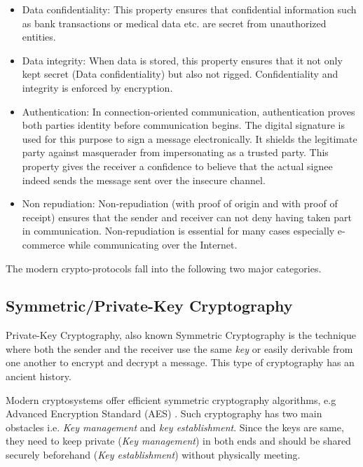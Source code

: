 \begin{itemize}
\item Data confidentiality: 
This property ensures that confidential information such as bank transactions or medical data etc. are secret from unauthorized entities. 

\item Data integrity:  
When data is stored, this property ensures that it not only kept secret (Data confidentiality) but also not rigged.
Confidentiality and integrity is enforced by encryption.

\item Authentication: 
In connection-oriented communication, authentication proves both parties identity before communication begins.
The digital signature is used for this purpose to sign a message electronically.
It shields the legitimate party against masquerader from impersonating as a trusted party.
This property gives the receiver a confidence to believe that the actual signee indeed sends the message sent over the insecure channel.

\item Non repudiation:
Non-repudiation (with proof of origin and with proof of receipt) ensures that the sender and receiver can not deny having taken part in communication.
Non-repudiation is essential for many cases especially e-commerce while communicating over the Internet.
\end{itemize}

The modern crypto-protocols fall into the following two major categories. 

\subsection{Symmetric/Private-Key Cryptography} 
Private-Key Cryptography, also known Symmetric Cryptography is the technique where both the sender and the receiver use the same \textit{key} or easily derivable from one another to encrypt and decrypt a message.
This type of cryptography has an ancient history. 

Modern cryptosystems offer efficient symmetric cryptography algorithms, e.g Advanced Encryption Standard (AES) \cite{AES_DaemenR02}.
Such cryptography has two main obstacles i.e. \textit{Key management} and \textit{key establishment}.
Since the keys are same, they need to keep private (\textit{Key management})  in both ends and should be shared securely beforehand (\textit{Key establishment}) without physically meeting.

